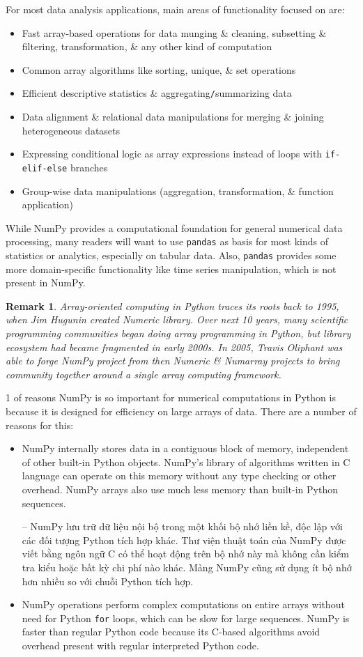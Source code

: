 \documentclass{article}
\newtheorem{remark}{Remark}
\begin{document}
\begin{itemize}
	For most data analysis applications, main areas of functionality focused on are:
	\begin{itemize}
		\item Fast array-based operations for data munging \& cleaning, subsetting \& filtering, transformation, \& any other kind of computation
		\item Common array algorithms like sorting, unique, \& set operations
		\item Efficient descriptive statistics \& aggregating{\tt/}summarizing data
		\item Data alignment \& relational data manipulations for merging \& joining heterogeneous datasets
		\item Expressing conditional logic as array expressions instead of loops with {\tt if-elif-else} branches
		\item Group-wise data manipulations (aggregation, transformation, \& function application)
	\end{itemize}
	While NumPy provides a computational foundation for general numerical data processing, many readers will want to use {\tt pandas} as basis for most kinds of statistics or analytics, especially on tabular data. Also, {\tt pandas} provides some more domain-specific functionality like time series manipulation, which is not present in NumPy.
	\begin{remark}
		Array-oriented computing in Python traces its roots back to 1995, when {\sc Jim Hugunin} created Numeric library. Over next 10 years, many scientific programming communities began doing array programming in Python, but library ecosystem had became fragmented in early 2000s. In 2005, {\sc Travis Oliphant} was able to forge NumPy project from then Numeric \& Numarray projects to bring community together around a single array computing framework.
	\end{remark}
	1 of reasons NumPy is so important for numerical computations in Python is because it is designed for efficiency on large arrays of data. There are a number of reasons for this:
	\begin{itemize}
		\item NumPy internally stores data in a contiguous block of memory, independent of other built-in Python objects. NumPy's library of algorithms written in C language can operate on this memory without any type checking or other overhead. NumPy arrays also use much less memory than built-in Python sequences.
		
		-- NumPy lưu trữ dữ liệu nội bộ trong một khối bộ nhớ liền kề, độc lập với các đối tượng Python tích hợp khác. Thư viện thuật toán của NumPy được viết bằng ngôn ngữ C có thể hoạt động trên bộ nhớ này mà không cần kiểm tra kiểu hoặc bất kỳ chi phí nào khác. Mảng NumPy cũng sử dụng ít bộ nhớ hơn nhiều so với chuỗi Python tích hợp.
		\item NumPy operations perform complex computations on entire arrays without need for Python {\tt for} loops, which can be slow for large sequences. NumPy is faster than regular Python code because its C-based algorithms avoid overhead present with regular interpreted Python code.
		

\end{itemize}
\end{itemize}
\end{document}
